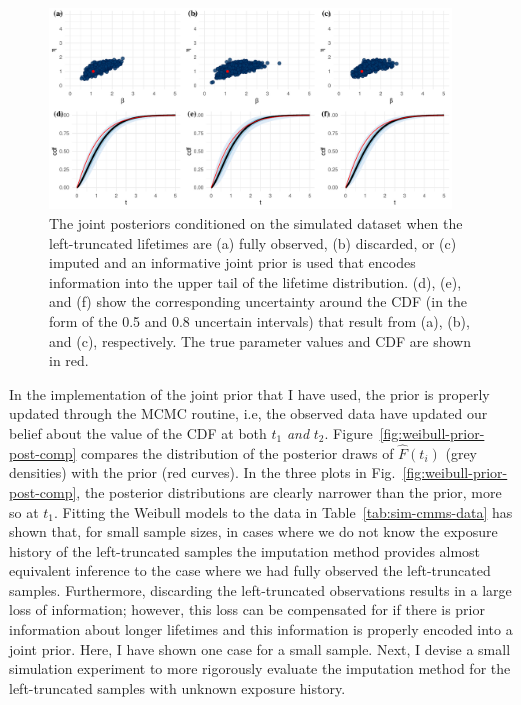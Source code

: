 \begin{figure}[tbp]
    \centering
    \includegraphics[width=0.95\textwidth]{./figures/ch-2/joint-posts-inf.pdf}
    \caption{The joint posteriors conditioned on the simulated dataset when the left-truncated lifetimes are (a) fully observed, (b) discarded, or (c) imputed and an informative joint prior is used that encodes information into the upper tail of the lifetime distribution. (d), (e), and (f) show the corresponding uncertainty around the CDF (in the form of the 0.5 and 0.8 uncertain intervals) that result from (a), (b), and (c), respectively. The true parameter values and CDF are shown in red.}
    \label{fig:joint-post-weibull-inf}
\end{figure}

In the implementation of the joint prior that I have used, the prior is properly updated through the MCMC routine, i.e, the observed data have updated our belief about the value of the CDF at both $t_1$ \emph{and} $t_2$. Figure~\ref{fig:weibull-prior-post-comp} compares the distribution of the posterior draws of $\hat{F}(t_i)$ (grey densities) with the prior (red curves). In the three plots in Fig.~\ref{fig:weibull-prior-post-comp}, the posterior distributions are clearly narrower than the prior, more so at $t_1$. Fitting the Weibull models to the data in Table~\ref{tab:sim-cmms-data} has shown that, for small sample sizes, in cases where we do not know the exposure history of the left-truncated samples the imputation method provides almost equivalent inference to the case where we had fully observed the left-truncated samples. Furthermore, discarding the left-truncated observations results in a large loss of information; however, this loss can be compensated for if there is prior information about longer lifetimes and this information is properly encoded into a joint prior. Here, I have shown one case for a small sample. Next, I devise a small simulation experiment to more rigorously evaluate the imputation method for the left-truncated samples with unknown exposure history.

